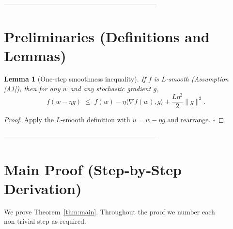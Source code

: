\documentclass{article}
\newtheorem{lemma}{Lemma}
\begin{document}
--------------------------------------------------------------------

\section*{Preliminaries (Definitions and Lemmas)}
\begin{lemma}[One‑step smoothness inequality]\label{lem:smooth}
If $f$ is $L$‑smooth (Assumption \ref{A1}), then for any $w$ and any stochastic gradient $g$,
\[
f(w-\eta g)\;\le\; f(w)-\eta\langle\nabla f(w),g\rangle+\frac{L\eta^{2}}{2}\|g\|^{2}.
\tag{5}
\]
\end{lemma}
\begin{proof}
Apply the $L$‑smooth definition with $u=w-\eta g$ and rearrange. \hfill $\square$
\end{proof}

--------------------------------------------------------------------

\section*{Main Proof (Step‑by‑Step Derivation)}
We prove Theorem~\ref{thm:main}. Throughout the proof we number each non‑trivial step as required.
\end{document}
